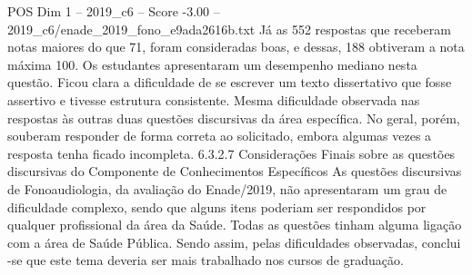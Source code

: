 \begin{textsample}{POS Dim 1 – 2019\_c6 – Score -3.00 – 2019\_c6/enade\_2019\_fono\_e9ada2616b.txt}
Já as 552 respostas que receberam notas maiores do que 71, foram consideradas boas, e dessas, 188 obtiveram a nota máxima 100.
Os estudantes apresentaram um desempenho mediano nesta questão.
Ficou clara a dificuldade de se escrever um texto dissertativo que fosse assertivo e tivesse estrutura consistente.
Mesma dificuldade observada nas respostas às outras duas questões discursivas da área específica.
No geral, porém, souberam responder de forma correta ao solicitado, embora algumas vezes a resposta tenha ficado incompleta. 6.3.2.7 Considerações Finais sobre as questões discursivas do Componente de Conhecimentos Específicos As questões discursivas de Fonoaudiologia, da avaliação do Enade/2019, não apresentaram um grau de dificuldade complexo, sendo que alguns itens poderiam ser respondidos por qualquer profissional da área da Saúde.
Todas as questões tinham alguma ligação com a área de Saúde Pública.
Sendo assim, pelas dificuldades observadas, conclui -se que este tema deveria ser mais trabalhado nos cursos de graduação.

\end{textsample}
